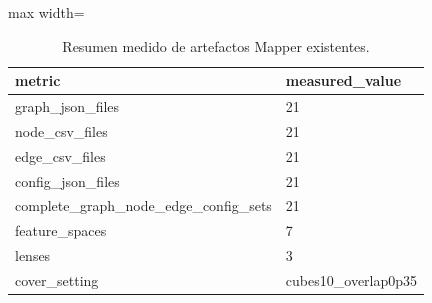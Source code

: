 \begin{table}[H]
\centering
\scriptsize
\caption{Resumen medido de artefactos Mapper existentes.}
\label{tab:output_manifest_summary}
\begin{adjustbox}{max width=\linewidth}
\begin{tabular}{ll}
\toprule
metric & measured\_value \\
\midrule
graph\_json\_files & 21 \\
node\_csv\_files & 21 \\
edge\_csv\_files & 21 \\
config\_json\_files & 21 \\
complete\_graph\_node\_edge\_config\_sets & 21 \\
feature\_spaces & 7 \\
lenses & 3 \\
cover\_setting & cubes10\_overlap0p35 \\
\bottomrule
\end{tabular}
\end{adjustbox}

\end{table}
